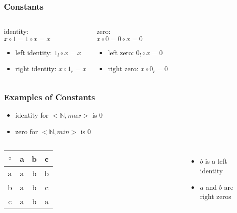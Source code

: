 \documentclass[dvipsnames]{beamer}
\begin{document}
\begin{frame}
  \frametitle{Constants}

  \begin{columns}
    \begin{definition}
      \alert{identity}:\\
      $x \circ 1 = 1 \circ x = x$

      \pause
      \begin{itemize}
        \item left identity: $1_l \circ x = x$
        \item right identity: $x \circ 1_r = x$
      \end{itemize}
    \end{definition}

    \pause
    \begin{definition}
      \alert{zero}:\\
      $x \circ 0 = 0 \circ x = 0$

      \pause
      \begin{itemize}
        \item left zero: $0_l \circ x = 0$
        \item right zero: $x \circ 0_r = 0$
      \end{itemize}
    \end{definition}
  \end{columns}
\end{frame}

\begin{frame}
  \frametitle{Examples of Constants}

  \begin{example}
    \begin{itemize}
      \item identity for $<\mathbb{N}, max>$ is $0$
      \item zero for $<\mathbb{N}, min>$ is $0$
    \end{itemize}
  \end{example}

  \pause
  \begin{example}
    \begin{columns}
      \begin{tabular}{c||c|c|c}
        $\circ$ & a & b & c\\\hline\hline
              a & a & b & b\\\hline
              b & a & b & c\\\hline
              c & a & b & a
      \end{tabular}

      \begin{itemize}
        \item $b$ is a left identity
        \item $a$ and $b$ are right zeros
      \end{itemize}
    \end{columns}
  \end{example}
\end{frame}
\end{document}
